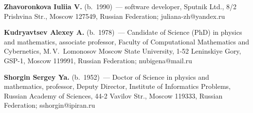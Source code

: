 \vspace*{-2pt}

\noindent
\textbf{Zhavoronkova Iuliia V.} (b.\ 1990)~--- software developer,
Sputnik Ltd., 8/2 Prishvina Str., Moscow 127549, Russian Federation; juliana-zh@yandex.ru



\noindent
\textbf{Kudryavtsev Alexey A.} (b.\ 1978)~---
Candidate of Science (PhD) in physics and mathematics, associate professor,
Faculty of Computational Mathematics and
Cybernetics, M.\,V.~Lomonosov Moscow State University,
1-52 Leninskiye Gory, GSP-1, Moscow 119991, Russian Federation; nubigena@mail.ru


\noindent
\textbf{Shorgin Sergey Ya.} (b.\ 1952)~--- Doctor of Science in physics and
mathematics, professor, Deputy Director, Institute of Informatics Problems,
Russian Academy of Sciences, 44-2 Vavilov Str., Moscow 119333,
Russian Federation; sshorgin@ipiran.ru


\label{end\stat}

\renewcommand{\bibname}{\protect\rm Литература}